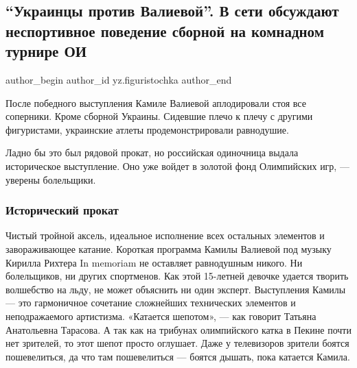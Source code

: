  
 
 
 
 
 
\subsection{\enquote{Украинцы против Валиевой}. В сети обсуждают неспортивное поведение сборной на комнадном турнире ОИ}
\label{sec:06_02_2022.yz.figuristochka.1.ukraincy_valieva}
 
\ifcmt
 author_begin
   author_id yz.figuristochka
 author_end
\fi

После победного выступления Камиле Валиевой аплодировали стоя все соперники.
Кроме сборной Украины. Сидевшие плечо к плечу с другими фигуристами, украинские
атлеты продемонстрировали равнодушие.

Ладно бы это был рядовой прокат, но российская одиночница выдала историческое
выступление. Оно уже войдет в золотой фонд Олимпийских игр, — уверены
болельщики. 

\subsubsection{Исторический прокат}

Чистый тройной аксель, идеальное исполнение всех остальных элементов и
завораживающее катание. Короткая программа Камилы Валиевой под музыку Кирилла
Рихтера In memoriam не оставляет равнодушным никого. Ни болельщиков, ни других
спортменов. Как этой 15-летней девочке удается творить волшебство на льду, не
может объяснить ни один эксперт. Выступления Камилы — это гармоничное сочетание
сложнейших технических элементов и неподражаемого артистизма. «Катается
шепотом», — как говорит Татьяна Анатольевна Тарасова. А так как на трибунах
олимпийского катка в Пекине почти нет зрителей, то этот шепот просто оглушает.
Даже у телевизоров зрители боятся пошевелиться, да что там пошевелиться —
боятся дышать, пока катается Камила.

